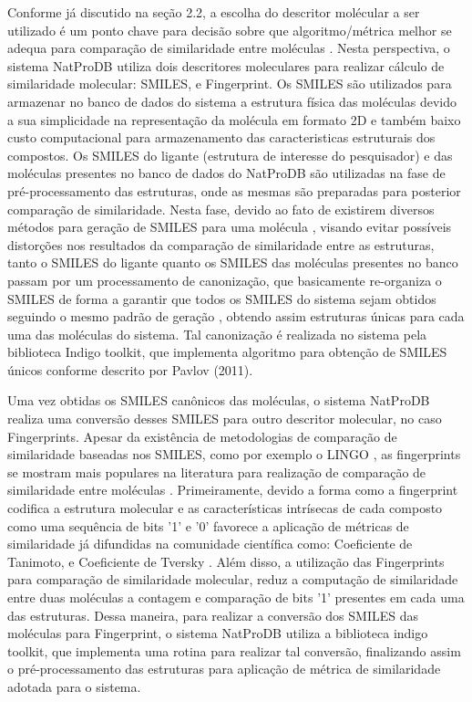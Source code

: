  Conforme já discutido na seção 2.2, a escolha do descritor molécular a ser utilizado é um ponto chave para decisão sobre que algoritmo/métrica melhor se adequa para comparação de similaridade entre moléculas \cite{todeschini2008handbook}. Nesta perspectiva, o sistema NatProDB utiliza dois descritores moleculares para realizar cálculo de similaridade molecular: SMILES, e Fingerprint. Os SMILES são utilizados para armazenar no banco de dados do sistema a estrutura física das moléculas devido a sua simplicidade na representação da molécula em formato 2D e também baixo custo computacional para armazenamento das caracteristicas estruturais dos compostos. Os SMILES do ligante (estrutura de interesse do pesquisador) e das moléculas presentes no banco de dados do NatProDB são utilizadas na fase de pré-processamento das estruturas, onde as mesmas são preparadas para posterior comparação de similaridade. Nesta fase, devido ao fato de existirem diversos métodos para geração de SMILES para uma molécula \cite{kumar2012}, visando evitar possíveis distorções nos resultados da comparação de similaridade entre as estruturas, tanto o SMILES do ligante quanto os SMILES das moléculas presentes no banco passam por um processamento de canonização, que basicamente re-organiza o SMILES de forma a garantir que todos os SMILES do sistema sejam obtidos seguindo o mesmo padrão de geração \cite{kumar2012}, obtendo assim estruturas únicas para cada uma das moléculas do sistema. Tal canonização é realizada no sistema pela biblioteca Indigo toolkit, que implementa algoritmo para obtenção de SMILES únicos conforme descrito por Pavlov (2011).

Uma vez obtidas os SMILES canônicos das moléculas, o sistema NatProDB realiza uma conversão    
desses SMILES para outro descritor molecular, no caso Fingerprints. Apesar da existência de metodologias de comparação de similaridade baseadas nos SMILES, como por exemplo o LINGO \cite{vidal2005lingo}, as fingerprints se mostram mais populares na literatura para realização de comparação de similaridade entre moléculas \cite{varnek2011fragment}. Primeiramente, devido a forma como a fingerprint codifica a estrutura molecular e as características intrísecas de cada composto como uma sequência de bits '1' e '0' favorece a aplicação de métricas de similaridade já difundidas na comunidade científica como: Coeficiente de Tanimoto, e Coeficiente de Tversky \cite{willett2003similarity}. Além disso, a utilização das Fingerprints para comparação de similaridade molecular, reduz a computação de similaridade entre duas moléculas a contagem e comparação de bits '1' presentes em cada uma das estruturas. Dessa maneira, para realizar  a conversão dos SMILES das moléculas para Fingerprint, o sistema NatProDB utiliza a biblioteca indigo toolkit, que implementa uma rotina para  realizar tal conversão, finalizando assim o pré-processamento das estruturas para aplicação de métrica de similaridade adotada para o sistema.


